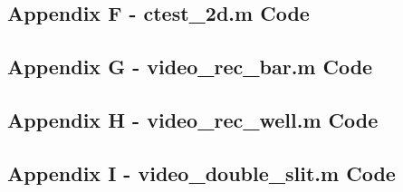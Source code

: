 \documentclass[10pt]{article}
\begin{document}
\subsection*{Appendix F - ctest\_2d.m Code}

\pagebreak

\subsection*{Appendix G - video\_rec\_bar.m Code}

\pagebreak

\subsection*{Appendix H - video\_rec\_well.m Code}

\pagebreak

\subsection*{Appendix I - video\_double\_slit.m Code}

\pagebreak
\end{document}
